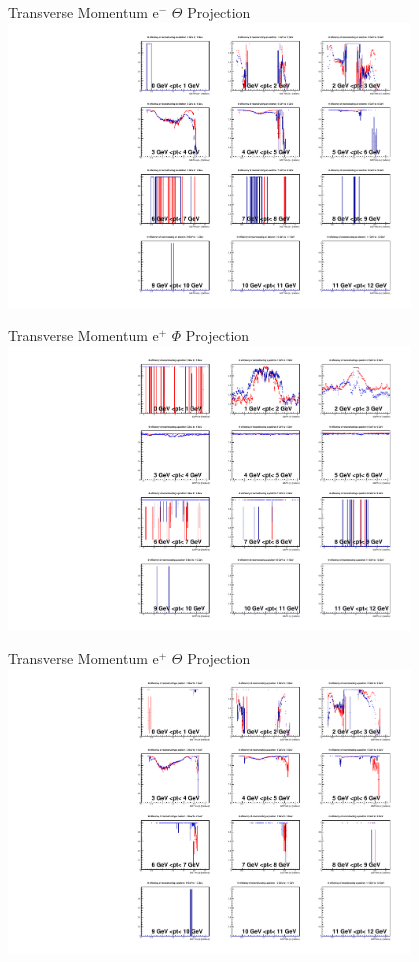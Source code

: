 \documentclass[10pt]{beamer}
\begin{document}
\begin{frame}{Transverse Momentum $\textrm{e}^-$ $\Theta$ Projection}
	\centering
	\includegraphics[width=0.8\textwidth]{Momentum/PtMThetaem.pdf}
\end{frame}


\begin{frame}{Transverse Momentum $\textrm{e}^+$ $\Phi$ Projection}
	\centering
	\includegraphics[width=0.8\textwidth]{Momentum/PtMPhiep.pdf}
\end{frame}


\begin{frame}{Transverse Momentum $\textrm{e}^+$ $\Theta$ Projection}
	\centering
	\includegraphics[width=0.8\textwidth]{Momentum/PtMThetaep.pdf}
\end{frame}
\end{document}
